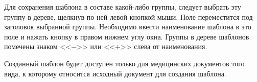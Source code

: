 {Для сохранения шаблона в составе какой-либо группы, следует выбрать эту группу в дереве, щелкнув по ней левой кнопкой мыши. Поле  переместится под заголовок выбранной группы. Необходимо ввести наименование шаблона в это поле и нажать кнопку  в правом нижнем углу окна. Группы в дереве шаблонов помечены знаком <<$-$>> или <<$+$>> слева от наименования.

Созданный шаблон будет доступен только для медицинских документов того вида, к которому относится исходный документ для создания шаблона. 



}
